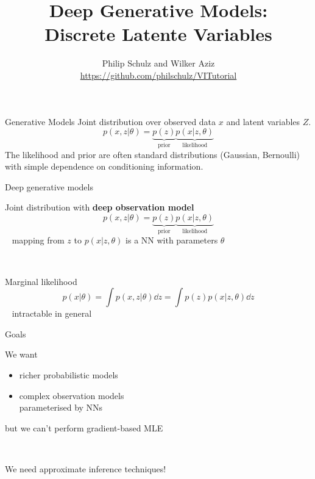\documentclass[14pt]{beamer}
\title{Deep Generative Models: \\
Discrete Latente Variables}
\author{Philip Schulz and Wilker Aziz\\
\url{https://github.com/philschulz/VITutorial}}
\date{}
\begin{document}
\begin{frame}
\maketitle
\end{frame}

\frame{\tableofcontents}


\begin{frame}{Generative Models}
Joint distribution over observed data $ x $ and latent variables $ Z $.
\begin{equation*}
p(x,z|\theta) =  \underbrace{p(z)}_{\text{prior}} \underbrace{p(x|z,\theta)}_{\text{likelihood}}
\end{equation*} 
The likelihood and prior are often standard distributions (Gaussian, Bernoulli) with simple dependence on conditioning
information.
\end{frame}

\begin{frame}{Deep generative models}

Joint distribution with {\bf deep observation model}
\begin{equation*}
p(x, z|\theta) = \underbrace{p(z)}_{\text{prior}} \underbrace{p(x|z, \theta)}_{\text{likelihood}}
\end{equation*}
~ {\small mapping from $z$ to $p(x|z, \theta)$ is a NN with parameters $\theta$}

~ \pause

Marginal likelihood 
\begin{equation*}
p(x|\theta) = \int p(x, z|\theta) \dd{z} = \int p(z)p(x|z, \theta) \dd{z} 
\end{equation*}
~ \alert{intractable} in general



\end{frame}


\begin{frame}{Goals}


We want
\begin{itemize}
	\item richer probabilistic models  \pause
	\item complex observation models \\
	parameterised by NNs 
\end{itemize}
\pause
but we can't perform gradient-based MLE

~

\pause

We need \alert{approximate inference} techniques!

\end{frame}
\end{document}

